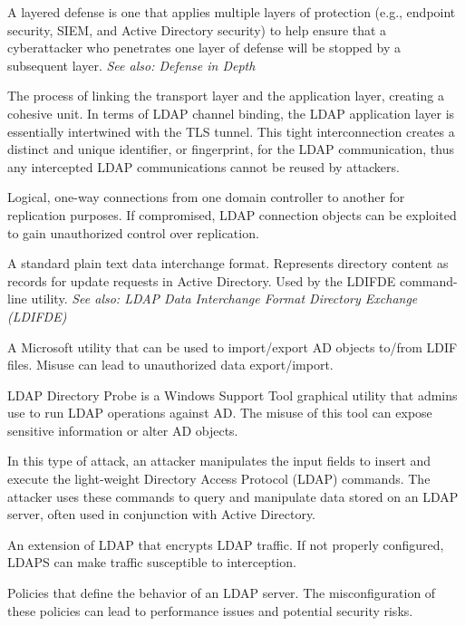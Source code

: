  A layered defense is one that applies multiple layers of protection (e.g., endpoint security, SIEM, and Active Directory security) to help ensure that a cyberattacker who penetrates one layer of defense will be stopped by a subsequent layer.
\textit{See also: Defense in Depth}

 The process of linking the transport layer and the application layer, creating a cohesive unit. In terms of LDAP channel binding, the LDAP application layer is essentially intertwined with the TLS tunnel. This tight interconnection creates a distinct and unique identifier, or fingerprint, for the LDAP communication, thus any intercepted LDAP communications cannot be reused by attackers.

 Logical, one-way connections from one domain controller to another for replication purposes. If compromised, LDAP connection objects can be exploited to gain unauthorized control over replication.

 A standard plain text data interchange format. Represents directory content as records for update requests in Active Directory. Used by the LDIFDE command-line utility.
\textit{See also: LDAP Data Interchange Format Directory Exchange (LDIFDE)}

 A Microsoft utility that can be used to import/export AD objects to/from LDIF files. Misuse can lead to unauthorized data export/import.

 LDAP Directory Probe is a Windows Support Tool graphical utility that admins use to run LDAP operations against AD. The misuse of this tool can expose sensitive information or alter AD objects.

 In this type of attack, an attacker manipulates the input fields to insert and execute the light-weight Directory Access Protocol (LDAP) commands. The attacker uses these commands to query and manipulate data stored on an LDAP server, often used in conjunction with Active Directory.

 An extension of LDAP that encrypts LDAP traffic. If not properly configured, LDAPS can make traffic susceptible to interception.

 Policies that define the behavior of an LDAP server. The misconfiguration of these policies can lead to performance issues and potential security risks.

